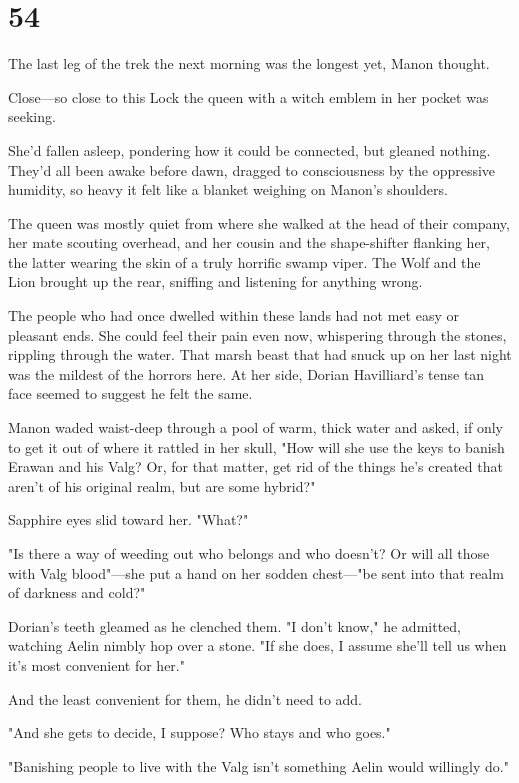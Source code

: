 
\chapter{54}

The last leg of the trek the next morning was the longest yet, Manon thought.

Close---so close to this Lock the queen with a witch emblem in her pocket was seeking.

She'd fallen asleep, pondering how it could be connected, but gleaned nothing.
They'd all been awake before dawn, dragged to consciousness by the oppressive humidity, so heavy it felt like a blanket weighing on Manon's shoulders.

The queen was mostly quiet from where she walked at the head of their company, her mate scouting overhead, and her cousin and the shape-shifter flanking her, the latter wearing the skin of a truly horrific swamp viper.
The Wolf and the Lion brought up the rear, sniffing and listening for anything wrong.

The people who had once dwelled within these lands had not met easy or pleasant ends.
She could feel their pain even now, whispering through the stones, rippling through the water.
That marsh beast that had snuck up on her last night was the mildest of the horrors here.
At her side, Dorian Havilliard's tense tan face seemed to suggest he felt the same.

Manon waded waist-deep through a pool of warm, thick water and asked, if only to get it out of where it rattled in her skull, "How will she use the keys to banish Erawan and his Valg?
Or, for that matter, get rid of the things he's created that aren't of his original realm, but are some hybrid?"

Sapphire eyes slid toward her.
"What?"

"Is there a way of weeding out who belongs and who doesn't?
Or will all those with Valg blood"---she put a hand on her sodden chest---"be sent into that realm of darkness and cold?"

Dorian's teeth gleamed as he clenched them.
"I don't know," he admitted, watching Aelin nimbly hop over a stone.
"If she does, I assume she'll tell us when it's most convenient for her."

And the least convenient for them, he didn't need to add.

"And she gets to decide, I suppose?
Who stays and who goes."

"Banishing people to live with the Valg isn't something Aelin would willingly do."

